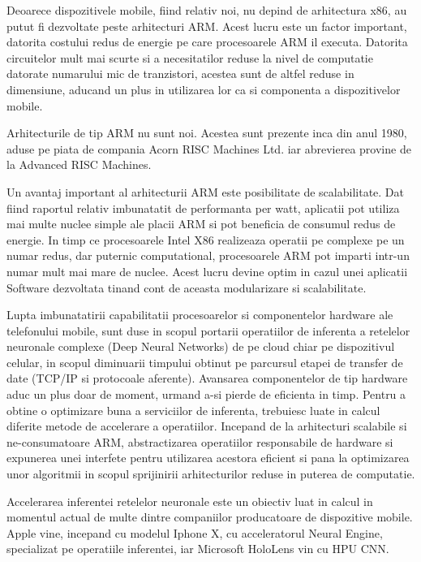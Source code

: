 	Deoarece dispozitivele mobile, fiind relativ noi, nu depind de arhitectura x86, au putut fi dezvoltate peste arhitecturi ARM. Acest lucru este un factor important, datorita costului redus de energie pe care procesoarele ARM il executa. Datorita circuitelor mult mai scurte si a necesitatilor reduse la nivel de computatie datorate numarului mic de tranzistori, acestea sunt de altfel reduse in dimensiune, aducand un plus in utilizarea lor ca si componenta a dispozitivelor mobile.
	
	Arhitecturile de tip ARM nu sunt noi. Acestea sunt prezente inca din anul 1980, aduse pe piata de compania Acorn RISC Machines Ltd. iar abrevierea provine de la Advanced RISC Machines. 
	
	Un avantaj important al arhitecturii ARM este posibilitate de scalabilitate. Dat fiind raportul relativ imbunatatit de performanta per watt, aplicatii pot utiliza mai multe nuclee simple ale placii ARM si pot beneficia de consumul redus de energie. In timp ce procesoarele Intel X86 realizeaza operatii pe complexe pe un numar redus, dar puternic computational, procesoarele ARM pot imparti intr-un numar mult mai mare de nuclee. Acest lucru devine optim in cazul unei aplicatii Software dezvoltata tinand cont de aceasta modularizare si scalabilitate.
	\cite{arm_architecture_android}
	
	Lupta imbunatatirii capabilitatii procesoarelor si componentelor hardware ale telefonului mobile, sunt duse in scopul portarii operatiilor de inferenta a retelelor neuronale complexe (Deep Neural Networks) de pe cloud chiar pe dispozitivul celular, in scopul diminuarii timpului obtinut pe parcursul etapei de transfer de date (TCP/IP si protocoale aferente). Avansarea componentelor de tip hardware aduc un plus doar de moment, urmand a-si pierde de eficienta in timp. Pentru a obtine o optimizare buna a serviciilor de inferenta, trebuiesc luate in calcul diferite metode de accelerare a operatiilor. Incepand de la arhitecturi scalabile si ne-consumatoare ARM, abstractizarea operatiilor responsabile de hardware si expunerea unei interfete pentru utilizarea acestora eficient si pana la optimizarea unor algoritmii in scopul sprijinirii arhitecturilor reduse in puterea de computatie.
	
	Accelerarea inferentei retelelor neuronale este un obiectiv luat in calcul in momentul actual de multe dintre companiilor producatoare de dispozitive mobile. Apple vine, incepand cu modelul Iphone X, cu acceleratorul Neural Engine, specializat pe operatiile inferentei, iar Microsoft HoloLens vin cu HPU CNN. \cite{arm_ml}
	
